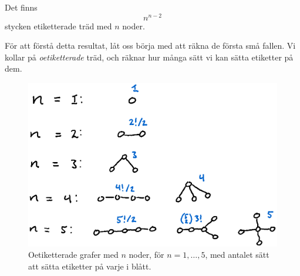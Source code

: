 \documentclass[nobib]{tufte-handout}
\begin{document}
\begin{theorem}
    Det finns
    $$n^{n-2}$$
    stycken etiketterade träd med $n$ noder.
\end{theorem}

För att förstå detta resultat, låt oss börja med att räkna de första små fallen. Vi kollar på \emph{oetiketterade} träd, och räknar hur många sätt vi kan sätta etiketter på dem.

\begin{figure}
    \centering
    \includegraphics[width = \textwidth]{graphics/counting_tree_labellings.png}
    \caption{Oetiketterade grafer med $n$ noder, för $n = 1,\ldots,5$, med antalet sätt att sätta etiketter på varje i blått.}
\end{figure}
\end{document}
